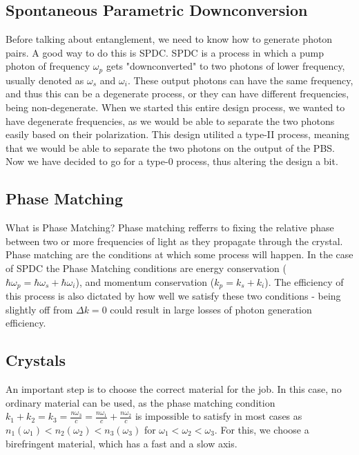 \documentclass{article}
\theoremstyle{mytheoremstyle}
\theoremstyle{mytheoremstyle}
\theoremstyle{myproblemstyle}
\begin{document}
\subsection{Spontaneous Parametric Downconversion}
Before talking about entanglement, we need to know how to generate photon pairs. A good way to do this is SPDC.
SPDC is a process in which a pump photon of frequency $\omega_p$ gets "downconverted" to two photons of lower frequency,
usually denoted as $\omega_s$ and $\omega_i$. These output photons can have the same frequency,
and thus this can be a degenerate process, or they can have different frequencies, being non-degenerate.
When we started this entire design process, we wanted to have degenerate frequencies, as we would be able to separate
the two photons easily based on their polarization. This design utilited a type-II process, meaning that we would be able 
to separate the two photons on the output of the PBS. Now we have decided to go for a type-0 process, thus altering the design a bit.

\subsection{Phase Matching}
What is Phase Matching? Phase matching refferrs to fixing the relative phase between two or more frequencies 
of light as they propagate through the crystal. Phase matching are the conditions at which some process will happen.
In the case of SPDC the Phase Matching conditions are energy conservation ($\hbar \omega_p = \hbar \omega_s + \hbar \omega_i$),
and momentum conservation ($k_p = k_s + k_i$). The efficiency of this process is also dictated by how well we satisfy these 
two conditions - being slightly off from $\Delta k = 0$ could result in large losses of photon generation efficiency.

\subsection{Crystals}
An important step is to choose the correct material for the job. In this case, no ordinary material can be used, 
as the phase matching condition $k_1 + k_2 = k_3 = \frac{n \omega_3}{c} = \frac{n \omega_1}{c} + \frac{n \omega_2}{c}$ is
impossible to satisfy in most cases as
$n_1 \left(	\omega_1 \right) < n_2 \left( \omega_2 \right) < n_3 \left(	\omega_3 \right)$ for $\omega_1 < \omega_2 < \omega_3$.
For this, we choose a birefringent material, which has a fast and a slow axis.
\end{document}
